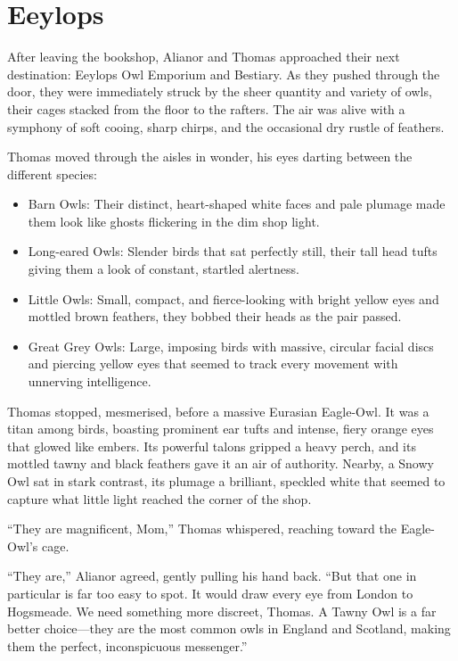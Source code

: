 \section*{Eeylops}

After leaving the bookshop, Alianor and Thomas approached their next destination: Eeylops Owl Emporium and Bestiary. As they pushed through the door, they were immediately struck by the sheer quantity and variety of owls, their cages stacked from the floor to the rafters. The air was alive with a symphony of soft cooing, sharp chirps, and the occasional dry rustle of feathers.

Thomas moved through the aisles in wonder, his eyes darting between the different species:

\begin{itemize}
    \item Barn Owls: Their distinct, heart-shaped white faces and pale plumage made them look like ghosts flickering in the dim shop light.

    \item Long-eared Owls: Slender birds that sat perfectly still, their tall head tufts giving them a look of constant, startled alertness.

    \item Little Owls: Small, compact, and fierce-looking with bright yellow eyes and mottled brown feathers, they bobbed their heads as the pair passed.

    \item Great Grey Owls: Large, imposing birds with massive, circular facial discs and piercing yellow eyes that seemed to track every movement with unnerving intelligence.
\end{itemize}

Thomas stopped, mesmerised, before a massive Eurasian Eagle-Owl. It was a titan among birds, boasting prominent ear tufts and intense, fiery orange eyes that glowed like embers. Its powerful talons gripped a heavy perch, and its mottled tawny and black feathers gave it an air of authority. Nearby, a Snowy Owl sat in stark contrast, its plumage a brilliant, speckled white that seemed to capture what little light reached the corner of the shop.

\enquote{They are magnificent, Mom,} Thomas whispered, reaching toward the Eagle-Owl's cage.

\enquote{They are,} Alianor agreed, gently pulling his hand back. \enquote{But that one in particular is far too easy to spot. It would draw every eye from London to Hogsmeade. We need something more discreet, Thomas. A Tawny Owl is a far better choice---they are the most common owls in England and Scotland, making them the perfect, inconspicuous messenger.}

